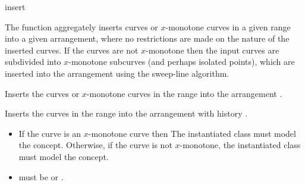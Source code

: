 \ccRefPageBegin

\begin{ccRefFunction}{insert}

\ccDefinition

The function \ccRefName{} aggregately inserts curves or $x$-monotone
curves in a given range into a given arrangement, where no
restrictions are made on the nature of the inserted curves.  If the
curves are not $x$-monotone then the input curves are subdivided into
$x$-monotone subcurves (and perhaps isolated points), which are
inserted into the arrangement using the sweep-line algorithm.



Inserts the curves or $x$-monotone curves in the range
\ccc{[first,last)} into the arrangement .




Inserts the curves in the range \ccc{[first,last)} into the
arrangement with history .

\ccRequirements
\begin{itemize}
\item If the curve is an $x$-monotone curve then The instantiated
   class must model the 
  concept. Otherwise, if the curve is not $x$-monotone, the
  instantiated  class must model the
   concept. 
\item {} must be  or
  .
\end{itemize}

\end{ccRefFunction}

\ccRefPageEnd
